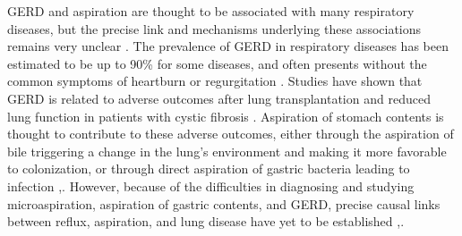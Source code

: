 \documentclass[12pt]{article}
\begin{document}
GERD and aspiration are thought to be associated with many respiratory diseases, but the precise 
link and mechanisms underlying these associations remains very unclear 
\cite{houghton-microaspiration-2016}. The prevalence of GERD in 
respiratory diseases has been estimated to be up to 90\% for some 
diseases, and often presents without the common symptoms of heartburn 
or regurgitation \cite{houghton-microaspiration-2016}. Studies have 
shown that GERD is related to adverse outcomes after lung 
transplantation \cite{sweet-gerd_asp-2009} and reduced lung function in patients with 
cystic fibrosis \cite{almomani-cf_sputum-2016}. Aspiration of stomach 
contents is thought to contribute to these adverse outcomes, either 
through the aspiration of bile triggering a change in the lung's 
environment and making it more favorable to colonization, or through 
direct aspiration of gastric bacteria leading to infection 
\cite{almomani-cf_sputum-2016},\cite{reen-aspirated_bile-2014}. 
However, because of the difficulties in diagnosing and studying 
microaspiration, aspiration of gastric contents, and GERD, precise 
causal links between reflux, aspiration, and lung disease have yet to 
be established \cite{almomani-cf_sputum-2016},\cite{houghton-microaspiration-2016}.
\end{document}
